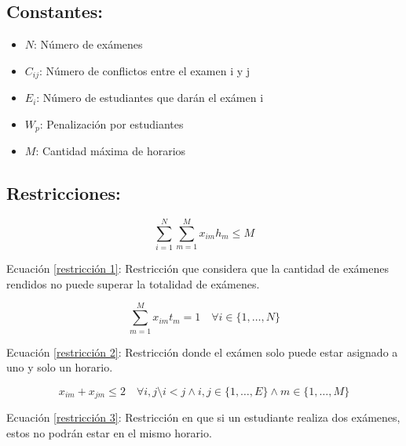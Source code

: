 \documentclass[letter, 10pt]{article}
\begin{document}
\subsection{Constantes:}

\begin{itemize}
    \item $N$: Número de exámenes
    \item  $C_{ij}$: Número de conflictos entre el examen i y j
    \item $E_{i}$: Número de estudiantes que darán el exámen i
    \item $W_{p}$: Penalización por estudiantes
    \item $M$: Cantidad máxima de horarios
\end{itemize}

\subsection{Restricciones:}
\begin{equation}
    \label{restricción 1}
    \sum_{i=1}^N \sum_{m=1}^M x_{im}h_{m} \leq M
\end{equation}
\begin{center}
    Ecuación \ref{restricción 1}: Restricción que considera que la cantidad de exámenes rendidos no puede superar la totalidad de exámenes.
\end{center}
\vspace{5mm}
\begin{equation}
    \label{restricción 2}
    \sum_{m=1}^M x_{im}t_{m} = 1 \quad \forall i \in \{1, \ldots, N\}
\end{equation}
\begin{center}
    Ecuación \ref{restricción 2}: Restricción donde el exámen solo puede estar asignado a uno y solo un horario.
\end{center}
\vspace{5mm}
\begin{equation}
    \label{restricción 3}
    x_{im} + x_{jm} \leq 2 \quad \forall i,j \setminus i<j \wedge i,j \in \{1, \ldots, E\} \wedge m \in \{1, \ldots, M\}
\end{equation}
\begin{center}
    Ecuación \ref{restricción 3}: Restricción en que si un estudiante realiza dos exámenes, estos no podrán estar en el mismo horario.
\end{center}
\end{document}
